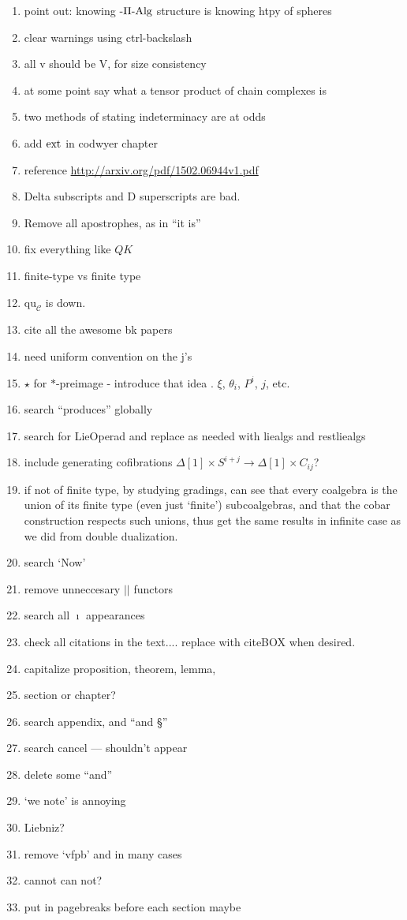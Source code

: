 \documentclass[11pt]{amsart} \renewcommand{\baselinestretch}{1.2}
\theoremstyle{plain}
\theoremstyle{definition}
\renewcommand{\to}{\longrightarrow}
\newcommand{\calc}{\mathcal{C}}
\newcommand{\quadratic}{\mathrm{qu}}
\newcommand{\diag}[1]{|#1|}
\begin{document}
\begin{todolist}
\begin{enumerate}
\item point out: knowing $\textup{-$\Pi$-Alg}$ structure is knowing htpy of spheres
\item clear warnings using ctrl-backslash
\item all \textup{v} should be \textup{V}, for size consistency
\item at some point say what a tensor product of chain complexes is
\item two methods of stating indeterminacy are at odds
\item add $\textup{ext}$ in codwyer chapter
\item reference \url{http://arxiv.org/pdf/1502.06944v1.pdf}
\item Delta subscripts and D superscripts are bad.
\item Remove all apostrophes, as in ``it is''
\item fix everything like $QK$
\item finite-type vs finite type
\item $\quadratic_\calc$ is down.
\item cite all the awesome bk papers
\item need uniform convention on the j's
\item $\star$ for $*$-preimage - introduce that idea . $\xi$, $\theta_i$, $P^i$, $j$, etc.
\item search ``produces'' globally
\item search for LieOperad and replace as needed with liealgs and restliealgs
\item include generating cofibrations $\Delta[1]\times S^{i+j}\to \Delta[1]\times C_{ij}$?
\item if not  of finite type, by studying gradings, can see that every coalgebra is the union of its finite type (even just `finite') subcoalgebras, and that the cobar construction respects such unions, thus get the same results in infinite case as we did from double dualization.
\item search `Now'
\item remove unneccesary $\diag{} $ functors
\item search all $\imath$ appearances
\item check all citations in the text.... replace with citeBOX when desired.
\item capitalize proposition, theorem, lemma, 
\item section or chapter?
\item search appendix, and ``and \S''
\item search cancel --- shouldn't appear
\item delete some ``and''
\item `we note' is annoying
\item Liebniz?
\item remove `vfpb' and \hfil in many cases
\item cannot can not?
\item put in pagebreaks before each section maybe
\end{enumerate}
\end{todolist}
\end{document}
